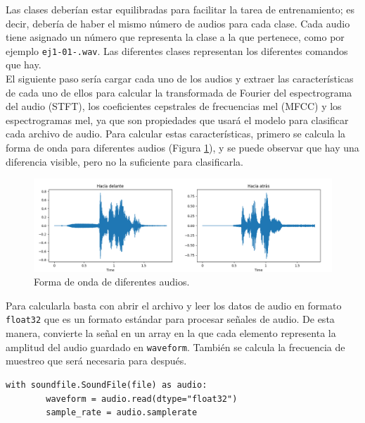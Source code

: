 Las clases deberían estar equilibradas para facilitar la tarea de entrenamiento; es decir, debería de haber el mismo número de audios para cada clase. Cada audio tiene asignado un número que representa la clase a la que pertenece, como por ejemplo \texttt{ej1-01-.wav}. Las diferentes clases representan los diferentes comandos que hay.\\


 El siguiente paso sería cargar cada uno de los audios y extraer las características de cada uno de ellos para calcular la transformada de Fourier del espectrograma del audio (STFT), los coeficientes cepstrales de frecuencias mel (MFCC) y los espectrogramas mel, ya que son propiedades que usará el modelo para clasificar cada archivo de audio. Para calcular estas características, primero se calcula la forma de onda para diferentes audios (Figura \ref{fig:onda}), y se puede observar que hay una diferencia visible, pero no la suficiente para clasificarla.
 
 \begin{figure}[H]
  \centering
  \includegraphics[scale=0.3]{figs/forma_onda} %
  \caption{ Forma de onda de diferentes audios.}
  \label{fig:onda}
\end{figure}



Para calcularla basta con abrir el archivo y leer los datos de audio en formato \texttt{float32} que es un formato estándar para procesar señales de audio. De esta manera, convierte la señal en un array en la que cada elemento representa la amplitud del audio guardado en \texttt{waveform}. También se calcula la frecuencia de muestreo que será necesaria para después.

\begin{verbatim}
with soundfile.SoundFile(file) as audio:
        waveform = audio.read(dtype="float32")
        sample_rate = audio.samplerate
\end{verbatim}

